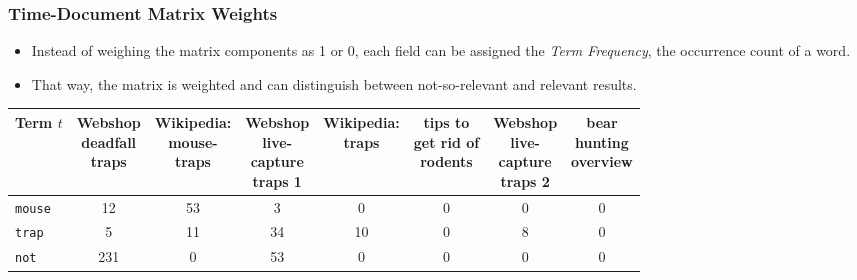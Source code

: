 \documentclass[a4paper, 11pt, accentcolor = tud3b]{tudreport}
\begin{document}
                \subsubsection{Time-Document Matrix Weights} %
                	\begin{itemize}
                		\item Instead of weighing the matrix components as 1 or 0, each field can be assigned the \textit{Term Frequency}, the occurrence count of a word.
                		\item That way, the matrix is weighted and can distinguish between not-so-relevant and relevant results.
                	\end{itemize}
                    \begin{table}[H]
                        \centering
                        \begin{tabular}{|l|c|c|c|c|c|c|c|}
                            \hline
                            \textbf{Term} \(t\) & \makecell{Webshop \\ deadfall \\ traps} & \makecell{Wikipedia: \\ mouse- \\ traps} & \makecell{Webshop \\ live- \\ capture \\ traps 1} & \makecell{Wikipedia: \\ traps} & \makecell{tips to \\ get rid of \\ rodents} & \makecell{Webshop \\ live- \\ capture \\ traps 2} & \makecell{bear \\ hunting \\ overview} \\ \hline
                            \texttt{mouse}  &         12         &         53         &         3          & \textcolor{irl}{0} & \textcolor{irl}{0} & \textcolor{irl}{0} & \textcolor{irl}{0} \\ \hline
                            \texttt{trap}   &         5          &         11         &         34         &         10         & \textcolor{irl}{0} &         8          & \textcolor{irl}{0} \\ \hline
                            \texttt{not}    &        231         & \textcolor{irl}{0} &         53         & \textcolor{irl}{0} & \textcolor{irl}{0} & \textcolor{irl}{0} & \textcolor{irl}{0} \\ \hline

\end{tabular}
\end{table}
\end{document}
